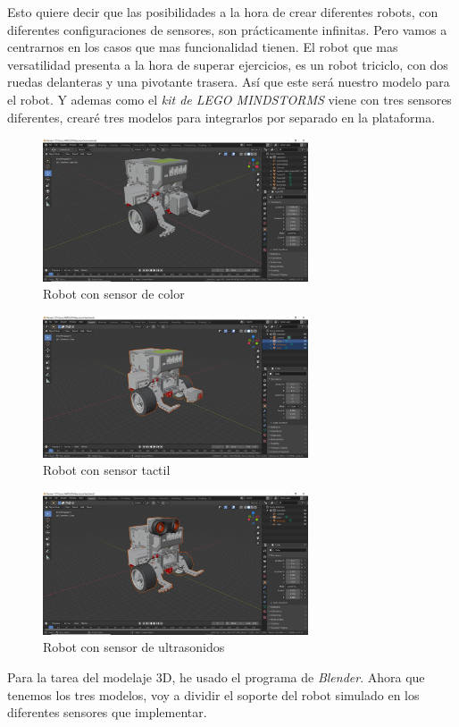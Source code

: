  Esto quiere decir que las posibilidades a la hora de crear diferentes robots, con diferentes configuraciones de sensores, son prácticamente infinitas. Pero vamos a centrarnos en los casos que mas funcionalidad tienen. El robot que mas versatilidad presenta a la hora de superar ejercicios, es un robot triciclo, con dos ruedas delanteras y una pivotante trasera. Así que este será nuestro modelo para el robot. Y ademas como el \textit{kit de LEGO MINDSTORMS} viene con tres sensores diferentes, crearé tres modelos para integrarlos por separado en la plataforma.
  \begin{figure}[H]
    \centering
    \includegraphics[width=0.7\textwidth]{img/blendercolor.jpg}
    \caption{Robot con sensor de color} \label{fig:color}
\end{figure}
 \begin{figure}[H]
    \centering
    \includegraphics[width=0.7\textwidth]{img/blendertouch.jpg}
    \caption{Robot con sensor tactil} \label{fig:tactil}
\end{figure}
 \begin{figure}[H]
    \centering
    \includegraphics[width=0.7\textwidth]{img/blenderus.jpg}
    \caption{Robot con sensor de ultrasonidos} \label{fig:ultrasonidos}
\end{figure}
Para la tarea del modelaje 3D, he usado el programa de \textit{Blender}. \newline
Ahora que tenemos los tres modelos, voy a dividir el soporte del robot simulado en los diferentes sensores que implementar.
